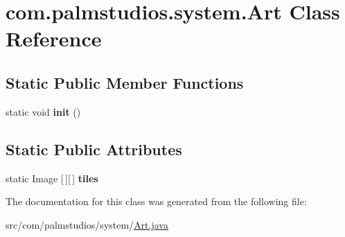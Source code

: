 \hypertarget{classcom_1_1palmstudios_1_1system_1_1_art}{}\section{com.\+palmstudios.\+system.\+Art Class Reference}
\label{classcom_1_1palmstudios_1_1system_1_1_art}
\subsection*{Static Public Member Functions}
\begin{DoxyCompactItemize}
\item 
\mbox{\label{classcom_1_1palmstudios_1_1system_1_1_art_aa9030c5705d93af0112f6ddb6cfaed49}} 
static void {\bfseries init} ()
\end{DoxyCompactItemize}
\subsection*{Static Public Attributes}
\begin{DoxyCompactItemize}
\item 
\mbox{\label{classcom_1_1palmstudios_1_1system_1_1_art_a747cf1091adf2be8df496cd07bf6e8f9}} 
static Image \mbox{[}$\,$\mbox{]}\mbox{[}$\,$\mbox{]} {\bfseries tiles}
\end{DoxyCompactItemize}


The documentation for this class was generated from the following file\+:\begin{DoxyCompactItemize}
\item 
src/com/palmstudios/system/\hyperlink{_art_8java}{Art.\+java}\end{DoxyCompactItemize}
